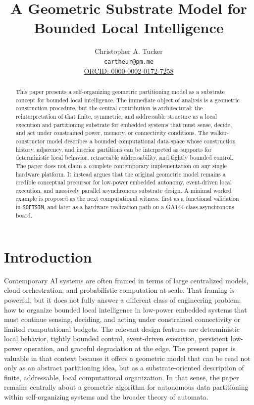 \documentclass[11pt]{article}
\title{A Geometric Substrate Model for\\
Bounded Local Intelligence}
\author{Christopher A. Tucker\\
\small \texttt{cartheur@pm.me}\\
\small \href{https://orcid.org/0000-0002-0172-7258}{ORCID: 0000-0002-0172-7258}}
\date{}
\begin{document}
\maketitle

\begin{abstract}
This paper presents a self-organizing geometric partitioning model as a
substrate concept for bounded local intelligence. The immediate object of
analysis is a geometric construction procedure, but the central contribution is
architectural: the reinterpretation of that finite, symmetric, and addressable
structure as a local execution and partitioning substrate for embedded systems
that must sense, decide, and act under constrained power, memory, or
connectivity conditions. The walker-constructor model describes a bounded
computational data-space whose construction history, adjacency, and interior
partitions can be interpreted as supports for deterministic local behavior,
retraceable addressability, and tightly bounded control. The paper does not
claim a complete contemporary implementation on any single hardware platform.
It instead argues that the original geometric model remains a credible
conceptual precursor for low-power embedded autonomy, event-driven local
execution, and massively parallel asynchronous substrate design. A minimal
worked example is proposed as the next computational witness: first as a
functional validation in \texttt{SOFTSIM}, and later as a hardware realization
path on a GA144-class asynchronous board.
\end{abstract}

\onehalfspacing

\section{Introduction}

Contemporary AI systems are often framed in terms of large centralized models,
cloud orchestration, and probabilistic computation at scale. That framing is
powerful, but it does not fully answer a different class of engineering
problem: how to organize bounded local intelligence in low-power embedded
systems that must continue sensing, deciding, and acting under constrained
connectivity or limited computational budgets. The relevant design features are
deterministic local behavior, tightly bounded control, event-driven execution,
persistent low-power operation, and graceful degradation at the edge. The
present paper is valuable in that context because it offers a geometric model
that can be read not only as an abstract partitioning idea, but as a
substrate-oriented description of finite, addressable, local computational
organization. In that sense, the paper remains centrally about a geometric
algorithm for autonomous data partitioning within self-organizing systems and
the broader theory of automata.
\end{document}
